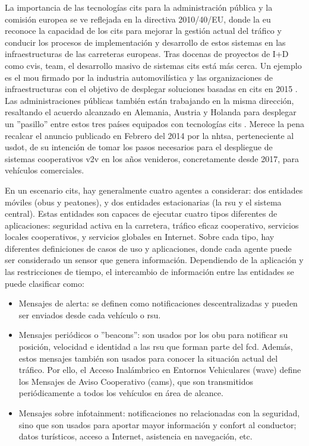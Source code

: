 La importancia de las tecnologías \gls{cits} para la administración pública y
la comisión europea se ve reflejada en la directiva 2010/40/EU, donde la
\gls{eu} reconoce la capacidad de los \gls{cits} para mejorar la gestión actual
del tráfico y conducir los procesos de implementación y desarrollo de estos
sistemas en las infraestructuras de las carreteras europeas. Tras docenas de
proyectos de I+D como \gls{cvis}, \gls{team}, el desarrollo masivo de sistemas
\gls{cits} está más cerca. Un ejemplo es el \gls{mou} firmado por la industria
automovilística y las organizaciones de infraestructuras con el objetivo de
desplegar soluciones basadas en \gls{cits} en 2015 \cite{3}. Las
administraciones públicas también están trabajando en la misma dirección,
resaltando el acuerdo alcanzado en Alemania, Austria y Holanda para desplegar
un ''pasillo'' entre estos tres países equipados con tecnologías \gls{cits}
\cite{4}. Merece la pena recalcar el anuncio publicado en Febrero del 2014 por
la \gls{nhtsa}, perteneciente al \gls{usdot}, de su intención de tomar los
pasos necesarios para el despliegue de sistemas cooperativos \gls{v2v} en los
años venideros, concretamente desde 2017, para vehículos comerciales.

En un escenario \gls{cits}, hay generalmente cuatro agentes a considerar: dos
entidades móviles (\gls{obu}s y peatones), y dos entidades estacionarias (la
\gls{rsu} y el sistema central). Estas entidades son capaces de ejecutar cuatro
tipos diferentes de aplicaciones: seguridad activa en la carretera, tráfico
eficaz cooperativo, servicios locales cooperativos, y servicios globales en
Internet. Sobre cada tipo, hay diferentes definiciones de casos de uso y
aplicaciones, donde cada agente puede ser considerado un sensor que genera
información. Dependiendo de la aplicación y las restricciones de  tiempo, el
intercambio de información entre las entidades se puede clasificar como:

\begin{itemize}
	\item Mensajes de alerta: se definen como notificaciones descentralizadas y
	pueden ser enviados desde cada vehículo o \gls{rsu}.

	\item Mensajes periódicos o ''beacons'': son usados por los \gls{obu} para
	notificar su posición, velocidad e identidad a las \gls{rsu} que forman parte
	del \gls{fcd}. Además, estos mensajes también son usados para conocer la
	situación	actual del tráfico. Por ello, el Acceso Inalámbrico en Entornos
	Vehiculares (\gls{wave})	define los Mensajes de Aviso Cooperativo
	(\gls{cam}s), que son transmitidos periódicamente	a todos los vehículos en
	área de alcance.

	\item Mensajes sobre infotainment: notificaciones no relacionadas con la
	seguridad, sino que son usados para aportar mayor información y confort al
	conductor; datos turísticos, acceso a Internet, asistencia en navegación, etc.
\end{itemize}

